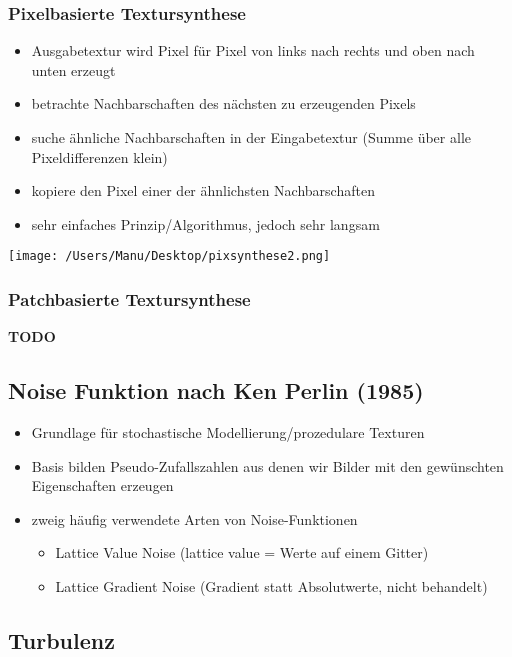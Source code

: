 \documentclass[paper=a4, fontsize=11pt]{scrartcl} %
\numberwithin{equation}{section} %
\numberwithin{figure}{section} %
\numberwithin{table}{section} %
\begin{document}
\subsubsection{Pixelbasierte Textursynthese}

\begin{itemize}
\item Ausgabetextur wird Pixel für Pixel von links nach rechts und oben nach unten erzeugt
\item betrachte Nachbarschaften des nächsten zu erzeugenden Pixels
\item suche ähnliche Nachbarschaften in der Eingabetextur (Summe über alle Pixeldifferenzen klein)
\item kopiere den Pixel einer der ähnlichsten Nachbarschaften
\item sehr einfaches Prinzip/Algorithmus, jedoch sehr langsam
\end{itemize}

\texttt{[image: /Users/Manu/Desktop/pixsynthese2.png]}

\subsubsection{Patchbasierte Textursynthese}

\textbf{TODO}

\subsection{Noise Funktion nach Ken Perlin (1985)}

\begin{itemize}
\item Grundlage für stochastische Modellierung/prozedulare Texturen
\item Basis bilden Pseudo-Zufallszahlen aus denen wir Bilder mit den gewünschten Eigenschaften erzeugen
\item zweig häufig verwendete Arten von Noise-Funktionen
\begin{itemize}
\item Lattice Value Noise (lattice value = Werte auf einem Gitter)
\item Lattice Gradient Noise (Gradient statt Absolutwerte, nicht behandelt)
\end{itemize}
\end{itemize}

\subsection{Turbulenz}
\end{document}
